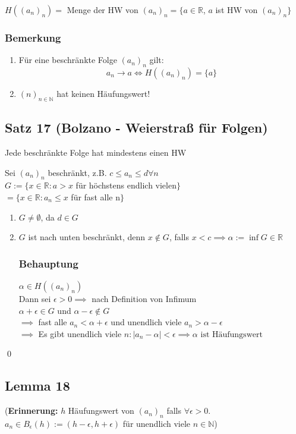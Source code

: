 \documentclass[fleqn]{scrbook}
\renewenvironment{proof}{{\bfseries Beweis }}{\qed}
\begin{document}
$H((a_n)_n) = $ Menge der HW von $(a_n)_n = \{ a\in\mathbb{R}$, $a$ ist HW von $(a_n)_n\}$
\subsubsection{Bemerkung}
\begin{enumerate}[1)]
\item Für eine beschränkte Folge $(a_n)_n$ gilt: $$a_n \rightarrow a \Leftrightarrow H((a_n)_n) = \{a\}$$
\item $(n)_{n\in\mathbb{N}}$ hat keinen Häufungswert!
\end{enumerate}
\subsection{Satz 17 (Bolzano - Weierstraß für Folgen)} Jede beschränkte Folge hat mindestens einen HW

\begin{proof}
Sei $(a_n)_n$ beschränkt, z.B. $c \leq a_n \leq d \forall n$\\
$G := \{ x\in\mathbb{R}: a > x$ für höchstens endlich vielen$\}$\\
$=\{x\in\mathbb{R}: a_n \leq x$ für fast alle n$\}$
\begin{enumerate}
\item $G \neq \emptyset$, da $d \in G$
\item $G$ ist nach unten beschränkt, denn $x \notin G$, falls $x < c \implies \alpha := \inf G \in \mathbb{R}$

\subsubsection{Behauptung} $\alpha \in H((a_n)_n)$\\
Dann sei $\epsilon > 0 \implies$ nach Definition von Infimum \\
$\alpha + \epsilon \in G$ und $\alpha - \epsilon \notin G$ \\
$\implies$ fast alle $a_n < \alpha + \epsilon$ und unendlich viele $a_n > \alpha - \epsilon$\\
$\implies$ Es gibt unendlich viele $n: |a_n - \alpha| < \epsilon \implies \alpha \text{ ist Häufungswert}$
\end{enumerate}
\end{proof}

\subsection{Lemma 18} 
(\textbf{Erinnerung:} $h$ Häufungswert von $(a_n)_n$ falls $\forall \epsilon > 0 $. $a_n \in B_\epsilon (h):= (h-\epsilon, h+\epsilon)$ für unendlich viele $n \in \mathbb{N}$)
\end{document}
